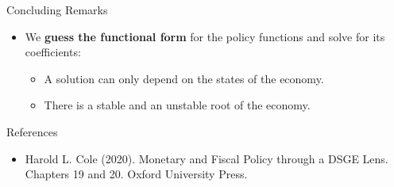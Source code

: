 \documentclass[10pt,c,aspectratio=1610,handout]{beamer}
\begin{document}
\begin{frame}{Concluding Remarks}
\begin{itemize}
\begin{itemize}
      \item[$\rightarrow$] Higher orders of approximation do not necessarily improve the model fit.%
    \end{itemize}%
    \vspace*{0.1in}%
    \pause%
    \item[$\blacktriangleright$] We \textbf{guess the functional form} for the policy functions and solve for its coefficients:%
    \begin{itemize}%
      \item[$\rightarrow$] A solution can only depend on the states of the economy.%
      \item[$\rightarrow$] There is a stable and an unstable root of the economy.%
    \end{itemize}%
  \end{itemize}%
\end{frame}%
\begin{frame}{References}%
  \begin{itemize}%
    \item[$\blacktriangleright$] Harold L. Cole (2020). Monetary and Fiscal Policy through a DSGE Lens. Chapters 19 and 20. Oxford University Press.%
  \end{itemize}%
\end{frame}%
\end{document}
